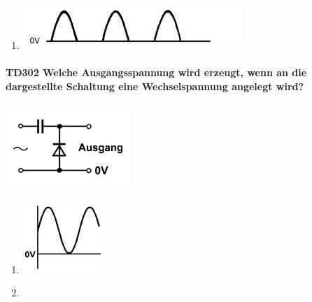 \documentclass[8pt]{article}
\begin{document}
\begin{enumerate}
\begin{enumerate}[nolistsep,label=\Alph*]
{\begin{enumerate}[nolistsep,label=\Alph*]
\begin{center}
\begin{minipage}{\linewidth}
	\end{minipage}
\end{center}
\item
\begin{center}
	\begin{minipage}{\linewidth}
		\centering
		\includegraphics[scale=1.0]{pics/td301_e.jpg}
	\end{minipage}
\end{center}
\end{enumerate}

\paragraph*{TD302 Welche Ausgangsspannung wird erzeugt, wenn an die dargestellte Schaltung eine Wechselspannung angelegt wird?}
\begin{center}
	\begin{minipage}{\linewidth}
		\centering
		\includegraphics[scale=1.0]{pics/td302_a.jpg}
	\end{minipage}
\end{center}
\begin{enumerate}[nolistsep,label=\Alph*]
\item
\begin{center}
	\begin{minipage}{\linewidth}
		\centering
		\includegraphics[scale=1.0]{pics/td302_b.jpg}
	\end{minipage}
\end{center}
\item
\begin{center}
	\begin{minipage}{\linewidth}

\end{minipage}
\end{center}
\end{enumerate}}
\end{enumerate}
\end{enumerate}
\end{document}

